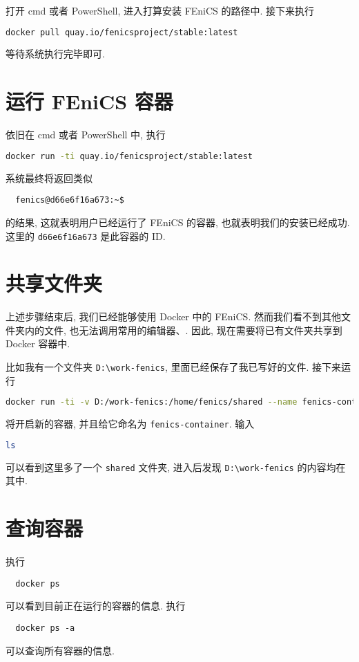 \documentclass[fontset=founder]{ctexrep}
\begin{document}
打开 \textsf{cmd} 或者 \textsf{PowerShell},
进入打算安装 FEniCS 的路径中.
接下来执行
\begin{lstlisting}[language=bash]
  docker pull quay.io/fenicsproject/stable:latest
\end{lstlisting}
等待系统执行完毕即可.

\section{运行 FEniCS 容器}

依旧在 \textsf{cmd} 或者 \textsf{PowerShell} 中,
执行
\begin{lstlisting}[language=bash]
  docker run -ti quay.io/fenicsproject/stable:latest
\end{lstlisting}
系统最终将返回类似
\begin{lstlisting}
  fenics@d66e6f16a673:~$
\end{lstlisting}
的结果,
这就表明用户已经运行了 FEniCS 的容器,
也就表明我们的安装已经成功.
这里的 \texttt{d66e6f16a673} 是此容器的 ID.

\section{共享文件夹}

上述步骤结束后,
我们已经能够使用 Docker 中的 FEniCS.
然而我们看不到其他文件夹内的文件,
也无法调用常用的编辑器、.
因此,
现在需要将已有文件夹共享到 Docker 容器中.

比如我有一个文件夹 \texttt{D:\textbackslash work-fenics},
里面已经保存了我已写好的文件.
接下来运行
\begin{lstlisting}[language=bash]
  docker run -ti -v D:/work-fenics:/home/fenics/shared --name fenics-container quay.io/fenicsproject/stable:latest
\end{lstlisting}
将开启新的容器,
并且给它命名为 \texttt{fenics-container}.
输入
\begin{lstlisting}[language=bash]
  ls
\end{lstlisting}
可以看到这里多了一个 \texttt{shared} 文件夹,
进入后发现 \texttt{D:\textbackslash work-fenics} 的内容均在其中.

\section{查询容器}

执行
\begin{lstlisting}
  docker ps
\end{lstlisting}
可以看到目前正在运行的容器的信息.
执行
\begin{lstlisting}
  docker ps -a
\end{lstlisting}
可以查询所有容器的信息.
\end{document}
